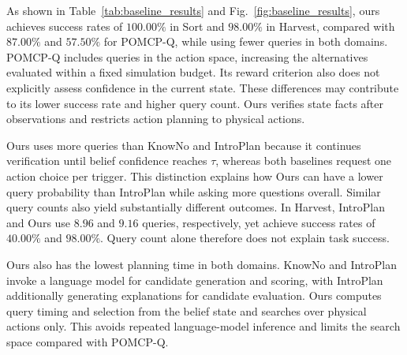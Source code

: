 

As shown in Table~\ref{tab:baseline_results} and Fig.~\ref{fig:baseline_results}, ours achieves success rates of $100.00\%$ in Sort and $98.00\%$ in Harvest, compared with $87.00\%$ and $57.50\%$ for POMCP-Q, while using fewer queries in both domains. POMCP-Q includes queries in the action space, increasing the alternatives evaluated within a fixed simulation budget. Its reward criterion also does not explicitly assess confidence in the current state. These differences may contribute to its lower success rate and higher query count. Ours verifies state facts after observations and restricts action planning to physical actions.

Ours uses more queries than KnowNo and IntroPlan because it continues verification until belief confidence reaches $\tau$, whereas both baselines request one action choice per trigger. This distinction explains how Ours can have a lower query probability than IntroPlan while asking more questions overall. Similar query counts also yield substantially different outcomes. In Harvest, IntroPlan and Ours use $8.96$ and $9.16$ queries, respectively, yet achieve success rates of $40.00\%$ and $98.00\%$. Query count alone therefore does not explain task success.

Ours also has the lowest planning time in both domains. KnowNo and IntroPlan invoke a language model for candidate generation and scoring, with IntroPlan additionally generating explanations for candidate evaluation. Ours computes query timing and selection from the belief state and searches over physical actions only. This avoids repeated language-model inference and limits the search space compared with POMCP-Q.



